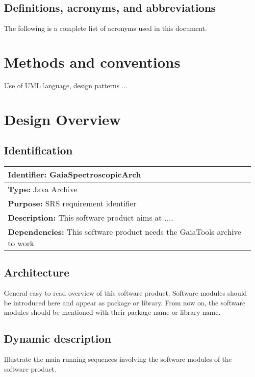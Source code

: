 \documentclass[SDCCH,esgsdraft,SDD]{esgsdoc}
\begin{document}
\subsection{Definitions, acronyms, and abbreviations \label{sect:acronyms}}
The following is a complete list of acronyms used in this document.
%

\section{Methods and conventions}
Use of UML language, design patterns ...

\section{Design Overview}

\subsection{Identification \label{sect:identification}}
\begin{longtable}{|p{}|}\hline
{\bf Identifier:} GaiaSpectroscopicArch \\\hline
{\bf Type:} Java Archive \\\hline
{\bf Purpose:} SRS requirement identifier\\\hline
{\bf Description:} This software product aims at .... \\\hline
{\bf Dependencies:} This software product needs the GaiaTools archive to work\\\hline
\end{longtable} \normalsize

\subsection{Architecture \label{sect:arc}}
General easy to read overview of this software product. Software modules should be introduced here and appear as package or library. From now on, the software modules should be mentioned with their package name or library name.

\subsection{Dynamic description \label{sect:dyn}}
Illustrate the main running sequences involving the software modules of the software product.
\end{document}
